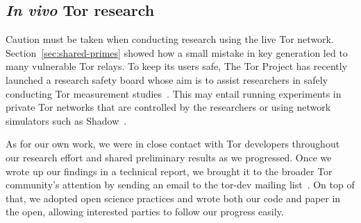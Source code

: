 
\subsection{\textit{In vivo} Tor research}
Caution must be taken when conducting research using the live Tor network.
Section~\ref{sec:shared-primes} showed how a small mistake in key generation led
to many vulnerable Tor relays.  To keep its users safe, The Tor Project has
recently launched a research safety board whose aim is to assist researchers in
safely conducting Tor measurement studies~\cite{safety-board}.  This may entail
running experiments in private Tor networks that are controlled by the
researchers or using network simulators such as Shadow~\cite{Jansen2012a}.

As for our own work, we were in close contact with Tor developers throughout our
research effort and shared preliminary results as we progressed.  Once we wrote
up our findings in a technical report, we brought it to the broader Tor
community's attention by sending an email to the tor-dev mailing
list~\cite{Roberts2017a}.  On top of that, we adopted open science practices and
wrote both our code and paper in the open, allowing interested parties to follow
our progress easily.

